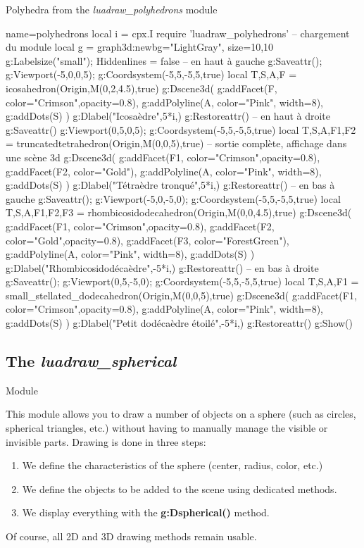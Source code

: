 \begin{demo}{Polyhedra from the \emph{luadraw\_polyhedrons} module}
\begin{luadraw}{name=polyhedrons}
local i = cpx.I
require 'luadraw_polyhedrons' -- chargement du module
local g = graph3d:new{bg="LightGray", size={10,10}}
g:Labelsize("small"); Hiddenlines = false
-- en haut à gauche 
g:Saveattr(); g:Viewport(-5,0,0,5); g:Coordsystem(-5,5,-5,5,true)
local T,S,A,F = icosahedron(Origin,M(0,2,4.5),true) 
g:Dscene3d(
    g:addFacet(F, {color="Crimson",opacity=0.8}),
    g:addPolyline(A, {color="Pink", width=8}),
    g:addDots(S) )
g:Dlabel("Icosaèdre",5*i,{})
g:Restoreattr()
-- en haut à droite
g:Saveattr()
g:Viewport(0,5,0,5); g:Coordsystem(-5,5,-5,5,true)
local T,S,A,F1,F2 = truncatedtetrahedron(Origin,M(0,0,5),true) -- sortie complète, affichage dans une scène 3d
g:Dscene3d(
    g:addFacet(F1, {color="Crimson",opacity=0.8}),
    g:addFacet(F2, {color="Gold"}),
    g:addPolyline(A, {color="Pink", width=8}),
    g:addDots(S) )
g:Dlabel("Tétraèdre tronqué",5*i,{})
g:Restoreattr()
-- en bas à gauche
g:Saveattr(); g:Viewport(-5,0,-5,0); g:Coordsystem(-5,5,-5,5,true)
local T,S,A,F1,F2,F3 = rhombicosidodecahedron(Origin,M(0,0,4.5),true)
g:Dscene3d(
    g:addFacet(F1, {color="Crimson",opacity=0.8}),
    g:addFacet(F2, {color="Gold",opacity=0.8}), g:addFacet(F3, {color="ForestGreen"}),
    g:addPolyline(A, {color="Pink", width=8}), g:addDots(S) )
g:Dlabel("Rhombicosidodécaèdre",-5*i,{})
g:Restoreattr()
-- en bas à droite
g:Saveattr(); g:Viewport(0,5,-5,0); g:Coordsystem(-5,5,-5,5,true)
local T,S,A,F1 = small_stellated_dodecahedron(Origin,M(0,0,5),true)
g:Dscene3d(
    g:addFacet(F1, {color="Crimson",opacity=0.8}),
    g:addPolyline(A, {color="Pink", width=8}),
    g:addDots(S) )
g:Dlabel("Petit dodécaèdre étoilé",-5*i,{})
g:Restoreattr()
g:Show()
\end{luadraw}
\end{demo}

\subsection{The \emph{luadraw\_spherical}} Module

This module allows you to draw a number of objects on a sphere (such as circles, spherical triangles, etc.) without having to manually manage the visible or invisible parts. Drawing is done in three steps:
\begin{enumerate}
    \item We define the characteristics of the sphere (center, radius, color, etc.)
    \item We define the objects to be added to the scene using dedicated methods.
    \item We display everything with the \textbf{g:Dspherical()} method.
\end{enumerate}
Of course, all 2D and 3D drawing methods remain usable.

